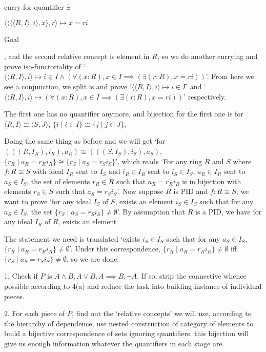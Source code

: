\documentclass[11pt]{article}
\begin{document}
curry for quantifier $\exists$

$\langle\langle \langle \langle R,I\rangle,i\rangle,x\rangle,r\rangle\mapsto x = ri$


Goal 

, and the second relative concept is element in $R$, so we do another currying and prove iso-functoriality of `$\langle \langle R,I\rangle,i\rangle \mapsto i\in I \land (\forall (x : R), x \in I\implies (\exists (r : R), x = ri))$'. From here we see a conjunction, we split is and prove `$\langle \langle R,I\rangle,i\rangle \mapsto i\in I$' and `$\langle \langle R,I\rangle,i\rangle\mapsto (\forall (x : R), x \in I\implies (\exists (r : R), x = ri))$' respectively. 

The first one has no quantifier anymore, and bijection for the first one is for $\langle R,I\rangle \cong \langle S,J\rangle$, $\{i\mid i\in I\} \cong \{j\mid j\in J\}$, 



Doing the same thing as before and we will get `for $(((R,I_R),i_R),a_R)\cong (((S,I_S),i_S),a_S)$, $\{r_R \mid a_R = r_Ri_R\} \cong \{r_S \mid a_S = r_Si_S\}$', which reads `For any ring $R$ and $S$ where $f:R\cong S$ with ideal $I_R$ sent to $I_S$ and $i_R\in I_R$ sent to $i_S\in I_S$, $a_R\in I_R$ sent to $a_S\in I_S$, the set of elements $r_R\in R$ such that $a_R=r_Ri_R$ is in bijection with elements $r_S\in S$ such that $a_S=r_Si_S$'. Now suppose $R$ is PID and $f: R\cong S$, we want to prove `for any ideal $I_S$ of $S$, exists an element $i_S\in I_S$ such that for any $a_S\in I_S$, the set $\{r_S\mid a_S=r_Si_S\}\ne \emptyset$'. By assumption that $R$ is a PID, we have for any ideal $I_R$ of $R$, exists an element 

The statement we need is translated `exists $i_S\in I_S$ such that for any $a_S\in I_S$, $\{r_R \mid a_R = r_Ri_R\} \ne \emptyset$'. Under this correspondence, $\{r_R \mid a_R = r_Ri_R\} \ne \emptyset$ iff $\{r_S \mid a_S = r_Si_S\}\ne \emptyset$, so we are done.

1. Check if $P$ is $A\land B,A\lor B,A\implies B, \lnot A$. If so, strip the connective whence possible according to 4(a) and reduce the task into building instance of individual pieces.

2. For each piece of $P$, find out the `relative concepts' we will use, according to the hierarchy of dependence, use nested construction of category of elements to build a bijective correspondence of sets ignoring quantifiers. this bijection will give us enough information whatever the quantifiers in each stage are.
\end{document}
